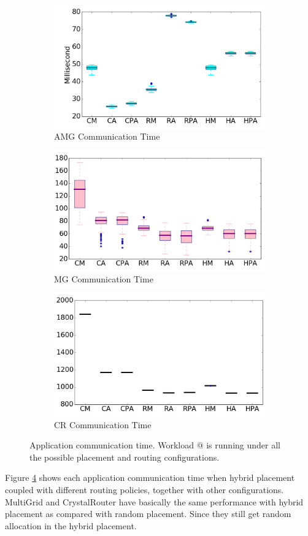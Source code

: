 \documentclass[conference,compsoc]{IEEEtran}
\makeatletter
\newcommand{\Rmnum}[1]{\expandafter\@slowromancap\romannumeral #1@}
\makeatother
\begin{document}
\begin{figure}[t!]
    \centering
    \begin{subfigure}[t]{0.32\textwidth}
        \centering
        \includegraphics[height=1.3 in]{hyb-plcmt/amg/commtime}
        \caption{AMG Communication Time}
        \label{fig:hyb-plcmt-amg-commtime}
    \end{subfigure}\hfill
    \hspace{1em}%
    \begin{subfigure}[t]{0.32\textwidth}
        \centering
        \includegraphics[height=1.3 in]{hyb-plcmt/mg/commtime}
        \caption{MG Communication Time}
        \label{fig:hyb-plcmt-mg-commtime}
    \end{subfigure}\hfill
    \begin{subfigure}[t]{0.32\textwidth}
        \centering
        \includegraphics[height=1.3 in]{hyb-plcmt/cr/commtime}
        \caption{CR Communication Time}
        \label{fig:hyb-plcmt-cr-commtime}
    \end{subfigure}%
   \caption{Application communication time. Workload \Rmnum{1} is running under all the possible placement and routing configurations.}
   \label{fig:hyb-plcmt-apps-commtime}
\end{figure}

Figure \ref{fig:hyb-plcmt-apps-commtime} shows each application communication time when hybrid placement coupled with different routing policies, together with other configurations. MultiGrid and CrystalRouter have basically the same performance with hybrid placement as compared with random placement. Since they still get random allocation in the hybrid placement. 
\end{document}

